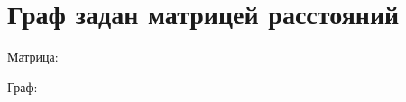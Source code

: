 \documentclass{article}
\begin{document}
    \section{Граф задан матрицей расстояний}
        Матрица:
        \begin{figure}[h!]
        \end{figure}
        \newpage
        Граф:
        \begin{figure}[h!]
        \end{figure}
\end{document}
